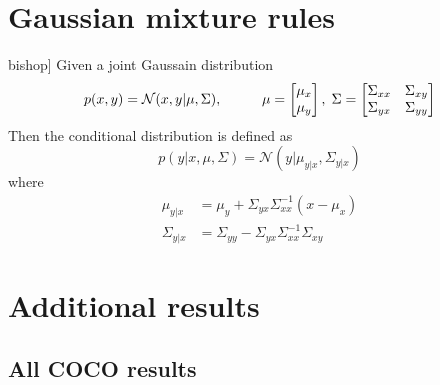 \chapter{Gaussian mixture rules}
\begin{testexample2}[Conditional of multivariate Gaussian \cite[90]{bishop}]
  Given a joint Gaussain distribution 
  $$p(x,y)= \mathcal{N}(x,y|\mu,\Sigma), 
\hspace{1cm} \mu=\begin{bmatrix}
    \mu_x \\ \mu_y
\end{bmatrix},\hspace{0.1cm} \Sigma = \begin{bmatrix}
    \Sigma_{xx} & \Sigma_{xy}\\ \Sigma_{yx}& \Sigma_{yy}
\end{bmatrix}$$
  Then the conditional distribution is defined as
  \begin{equation}\label{GaussianConditional}
    p(y|x,\mu, \Sigma) = \mathcal{N}(y|\mu_{y|x},\Sigma_{y|x} )
  \end{equation}
  where 
  \begin{align*}
      \mu_{y|x} &= \mu_y+\Sigma_{yx}\Sigma_{xx}^{-1}(x-\mu_x)\\
      \Sigma_{y|x} &= \Sigma_{yy}-\Sigma_{yx}\Sigma_{xx}^{-1}\Sigma_{xy} 
  \end{align*}
\end{testexample2}


\chapter{Additional results}

\section{All COCO results}

